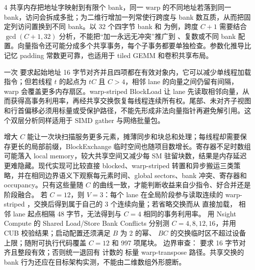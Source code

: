 \begin{solutionexercise}{4}
共享内存把地址字映射到有限个 bank，同一 warp 的不同地址若落到同一 bank，访问会拆成多批；为二维行增加一列常使行跨度与 bank 数互质，从而把固定列访问置换到不同 bank。以 32 个四字节 bank 和  为例，跨度 $C+1$ 需要结合 $\gcd(C+1,32)$ 分析，不能把“加一永远无冲突”推广到 、复数或不同 bank 配置。向量指令还可能分成多个共享事务，每个子事务都要单独检查。参数化推导比记忆 padding 常数更可靠，也适用于 tiled GEMM 和卷积共享布局。

一次  要求起始地址 16 字节对齐并且四项都在有效对象内，它可以减少单线程加载指令；但若线程 $t$ 的起点为 $tC$ 且 $C>4$，相邻 lane 的向量之间仍留有间隔，warp 会覆盖更多内存扇区。warp-striped BlockLoad 让 lane 先读取相邻向量，从而获得高事务利用率，再经共享交换恢复每线程连续所有权。尾部、未对齐子视图和行首偏移必须用标量或受保护路径，不能先形成非法向量指针再避免解引用。这个双层分析同样适用于 SIMD gather 与网络批量包。

增大 $C$ 能让一次块扫描服务更多元素，摊薄同步和块总和处理；每线程却需要保存更长的局部前缀，BlockExchange 临时空间也随项目数增长。寄存器不足时数组可能落入 local memory，较大共享空间又减少每 SM 驻留块数，结果是内存延迟更难隐藏。现代实现可比较直接 blocked、warp-striped 转置和异步搬运三类策略，并在相同边界语义下观察每元素时间、global sectors、bank 冲突、寄存器和 occupancy。只有这些量随 $C$ 的曲线一致，才能判断收益来自少指令、好合并还是阶段融合。
\variantheading 若 $C=12$，则 $V=3$：每个 lane 在全局阶段参与读取连续的 warp-striped
，交换后得到属于自己的 3 个连续向量；若省略交换而从  直接加载，
相邻 lane 起点相隔 48 字节，无法得到与 $C=4$ 相同的事务利用率。
\practiceheading 用 Nsight Compute 的 Shared Load/Store Bank Conflicts 分别测
$C=4,8,12,16$，并用 CUB  校验结果；启动配置还须满足 $B$ 为 2 的幂、
$BC$ 的交换临时区不超过设备上限；随附可执行代码覆盖 $C=12$ 和 997 项尾块。
边界审查： 要求 16 字节对齐且整段有效；否则统一退回有  计数的
标量 warp-transpose 路径。共享交换的 bank 行为还应在目标架构实测，不能由二维数组外形臆断。
\end{solutionexercise}

